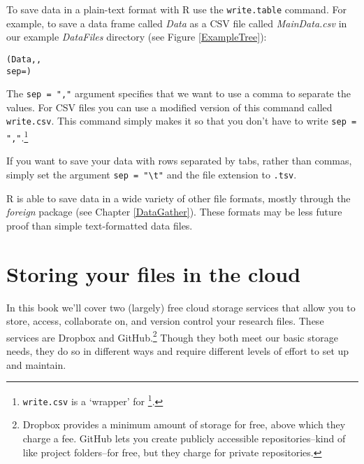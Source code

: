 To save data in a plain-text format with R use the \texttt{write.table} command. For example, to save a data frame called {\emph{Data}} as a CSV file called {\emph{MainData.csv}} in our example {\emph{DataFiles}} directory (see Figure \ref{ExampleTree}):

\begin{knitrout}
\color{fgcolor}\begin{kframe}
\begin{alltt}
(Data, ,
                 sep = )
\end{alltt}
\end{kframe}
\end{knitrout}


\noindent The \texttt{sep = ","} argument specifies that we want to use a comma to separate the values. For CSV files you can use a modified version of this command called \texttt{write.csv}. This command simply makes it so that you don't have to write \texttt{sep = ","}.\footnote{\texttt{write.csv} is a `wrapper' for \footnote{write.table}.} 

If you want to save your data with rows separated by tabs, rather than commas, simply set the argument \verb|sep = "\t"| and the file extension to \texttt{.tsv}.\label{TSVEscape}

R is able to save data in a wide variety of other file formats, mostly through the {\emph{foreign}} package (see Chapter \ref{DataGather}). These formats may be less future proof than simple text-formatted data files.

\section{Storing your files in the cloud}

In this book we'll cover two (largely) free cloud storage services that allow you to store, access, collaborate on, and version control your research files. These services are Dropbox and GitHub.\footnote{Dropbox provides a minimum amount of storage for free, above which they charge a fee. GitHub lets you create publicly accessible repositories--kind of like project folders--for free, but they charge for private repositories.} Though they both meet our basic storage needs, they do so in different ways and require different levels of effort to set up and maintain.

